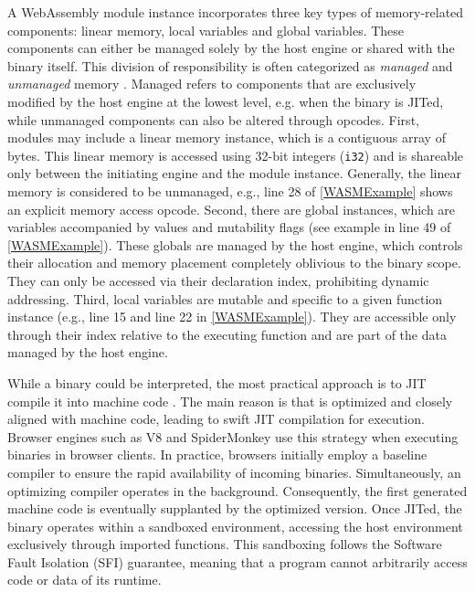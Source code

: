  A WebAssembly module instance incorporates three key types of memory-related components: linear memory, local variables and global variables. 
These components can either be managed solely by the host engine or shared with the \Wasm binary itself. 
This division of responsibility is often categorized as \emph{managed} and \emph{unmanaged} memory \cite{usenixWasm2020}. 
Managed refers to components that are exclusively modified by the host engine at the lowest level, e.g. when the \Wasm binary is JITed, while unmanaged components can also be altered through  \Wasm opcodes.
First, modules may include a linear memory instance, which is a contiguous array of bytes. 
This linear memory is accessed using 32-bit integers (\texttt{i32}) and is shareable only between the initiating engine and the \Wasm module instance. 
Generally, the linear memory is considered to be unmanaged, e.g., line 28 of \autoref{WASMExample} shows an explicit memory access opcode. 
Second, there are global instances, which are variables accompanied by values and mutability flags (see example in line 49 of \autoref{WASMExample}). 
These globals are managed by the host engine, which controls their allocation and memory placement completely oblivious to the \Wasm binary scope. 
They can only be accessed via their declaration index, prohibiting dynamic addressing. 
Third, local variables are mutable and specific to a given function instance (e.g., line 15 and line 22 in \autoref{WASMExample}). 
They are accessible only through their index relative to the executing function and are part of the data managed by the host engine.


While a \Wasm binary could be interpreted, the most practical approach is to JIT compile it into machine code \cite{2023arXiv230513241T}.
The main reason is that \Wasm is optimized and closely aligned with machine code, leading to swift JIT compilation for execution.
Browser engines such as V8 and SpiderMonkey use this strategy when executing \Wasm binaries in browser clients.
In practice, browsers initially employ a baseline compiler to ensure the rapid availability of incoming \Wasm binaries. 
Simultaneously, an optimizing compiler operates in the background. 
Consequently, the first generated machine code is eventually supplanted by the optimized version. 
Once JITed, the \Wasm binary operates within a sandboxed environment, accessing the host environment exclusively through imported functions.
This sandboxing follows the Software Fault Isolation (SFI) guarantee, meaning that a \Wasm program cannot arbitrarily access code or data of its runtime.  


